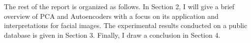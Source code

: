 The rest of the report is organized as follows. In Section 2, I will give a
brief overview of PCA and Autoencoders with a focus on its application and
interpretations for facial images. The experimental results conducted on a
public database is given in Section 3. Finally, I draw a conclusion in Section
4.
